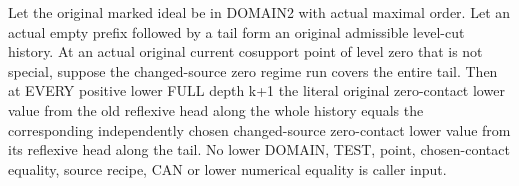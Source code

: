 \begin{theorem}
\label{hir:original-zero-empty-prefix-base-values}
\leanok
Let the original marked ideal be in DOMAIN2 with actual maximal order.
Let an actual empty prefix followed by a tail form an original admissible
level-cut history. At an actual original current cosupport point of level
zero that is not special, suppose the changed-source zero regime run
covers the entire tail. Then at EVERY positive lower FULL depth k+1 the
literal original zero-contact lower value from the old reflexive head
along the whole history equals the corresponding independently chosen
changed-source zero-contact lower value from its reflexive head along the
tail. No lower DOMAIN, TEST, point, chosen-contact equality, source recipe,
CAN or lower numerical equality is caller input.
\end{theorem}
